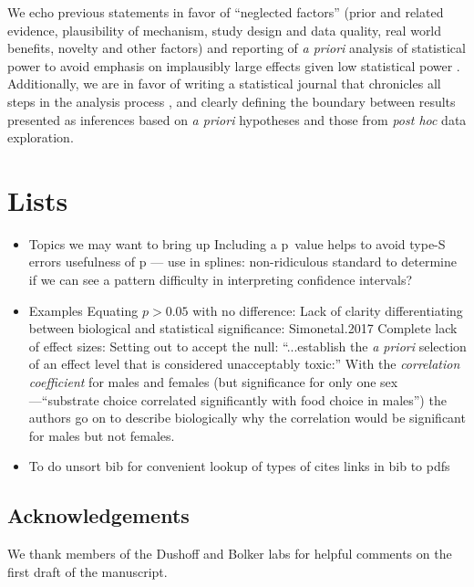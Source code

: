 We echo previous statements in favor of ``neglected factors'' (prior and related evidence, plausibility of mechanism, 
study design and data quality, real world benefits, novelty and other factors) \citep{McShaneetal.2017} and 
reporting of \emph{a priori} analysis of statistical power to avoid emphasis on implausibly large effects given low 
statistical power \citep[the "winners curse"][]{GelmanandCarlin2014, SzucsandIoannidis2017, Bernardietal.2017}. 
Additionally, we are in favor of writing a statistical journal that chronicles all steps in the analysis process 
\citep{Kassetal.2016}, and clearly defining the boundary between results presented as inferences based on \emph{a priori}
hypotheses and those from \emph{post hoc} data exploration.


\section*{Lists}

\begin{itemize}
  \item Topics we may want to bring up
	  \subitem Including a p~value helps to avoid type-S errors
      \subitem usefulness of p --- use in splines: non-ridiculous standard to determine if we can see a pattern
      \subitem difficulty in interpreting confidence intervals?
\end{itemize}

\begin{itemize}
  \item Examples
  \subitem Equating $p > 0.05$ with no difference: \citep{Ortegoetal.2007, Bukovinszkyetal.2017, Singhetal.2017, Sundinetal.2017}
  \subitem Lack of clarity differentiating between biological and statistical significance: {Simonetal.2017}
  \subitem Complete lack of effect sizes: \citep{Juriadoetal.2017}
  \subitem Setting out to accept the null: \citep{Karulinetal.2015}
  \subitem ``...establish the \emph{a priori} selection of an effect level that is considered unacceptably toxic:'' \citep{Dentonetal.2011}
  \subitem With the \emph{correlation coefficient} for males and females (but significance for only one sex---``substrate 
  choice correlated significantly with food choice in males'') the authors go on to describe biologically why the 
  correlation would be significant for males but not females.
\citep{MerilaitaandJormalainen1997}
\end{itemize}

\begin{itemize}
  \item To do
  	\subitem unsort bib for convenient lookup of types of cites
    \subitem links in bib to pdfs
\end{itemize}

\subsection*{Acknowledgements}

We thank members of the Dushoff and Bolker labs for helpful comments on the first draft of the manuscript.


